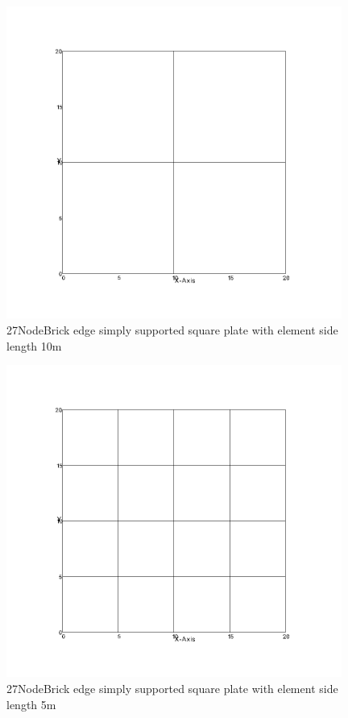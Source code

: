\documentclass[fleqn,11pt,letter]{article}
\begin{document}
\begin{figure}[H]
  \centering
  \includegraphics[width=11cm]{../Figure_files/27NodeBrick/square_plate1.png}
  \caption{27NodeBrick edge simply supported square plate with element side length 10m }
  \label{fig 27NodeBrick edges simply supported square plate with element side length 10m }
\end{figure}

\newpage

\begin{figure}[H]
  \centering
  \includegraphics[width=11cm]{../Figure_files/27NodeBrick/square_plate2.png}
  \caption{27NodeBrick edge simply supported square plate with element side length 5m }
  \label{fig 27NodeBrick edges simply supported square plate with element side length 5m }
\end{figure}
\end{document}
